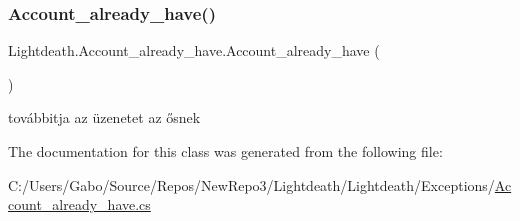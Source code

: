 \subsubsection{\texorpdfstring{Account\+\_\+already\+\_\+have()}{Account\_already\_have()}}
{\footnotesize\ttfamily Lightdeath.\+Account\+\_\+already\+\_\+have.\+Account\+\_\+already\+\_\+have (\begin{DoxyParamCaption}{ }\end{DoxyParamCaption})\hspace{0.3cm}{\ttfamily [inline]}}



továbbitja az üzenetet az ősnek 



The documentation for this class was generated from the following file\+:\begin{DoxyCompactItemize}
\item 
C\+:/\+Users/\+Gabo/\+Source/\+Repos/\+New\+Repo3/\+Lightdeath/\+Lightdeath/\+Exceptions/\hyperlink{_account__already__have_8cs}{Account\+\_\+already\+\_\+have.\+cs}\end{DoxyCompactItemize}

